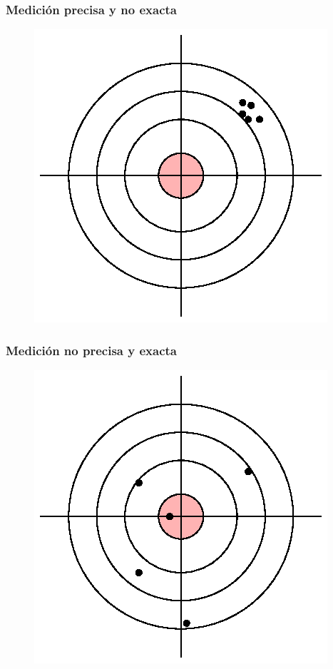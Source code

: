 \documentclass[12pt]{beamer}
\begin{document}
\begin{frame}
\frametitle{Medición precisa y no exacta}
\begin{figure}
    \centering  
    \includegraphics[scale=1]{Imagenes/exactitud_precision_02.eps}
\end{figure}
\end{frame}
\begin{frame}
\frametitle{Medición no precisa y exacta}
\begin{figure}
    \centering  
    \includegraphics[scale=1]{Imagenes/exactitud_precision_04.eps}
\end{figure}
\end{frame}
\end{document}
